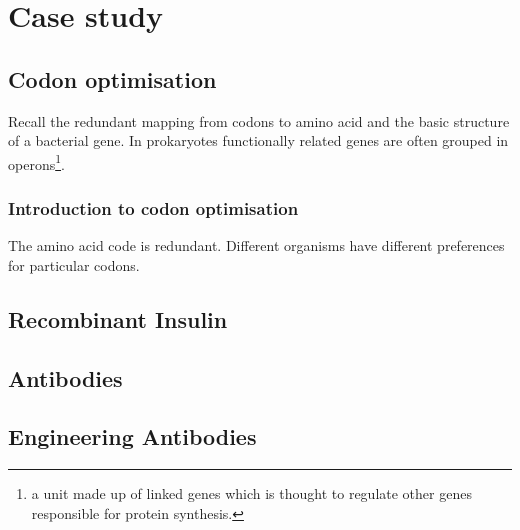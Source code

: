 \chapter{Case study}

\section{Codon optimisation}
Recall the redundant mapping from codons to amino acid and the basic structure of a bacterial gene. In prokaryotes functionally related genes are often grouped in operons\footnote{a unit made up of linked genes which is thought to regulate other genes responsible for protein synthesis.}.
\subsection{Introduction to codon optimisation}
The amino acid code is redundant. Different organisms have different preferences for particular codons.
\section{Recombinant Insulin}

\section{Antibodies}
\section{Engineering Antibodies}